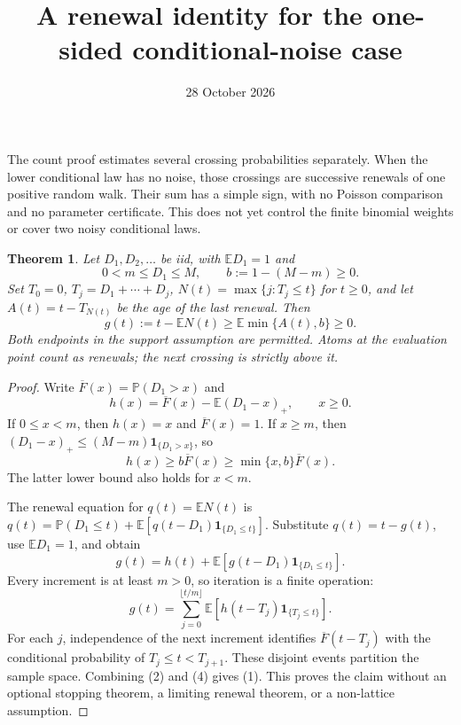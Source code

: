 \documentclass[11pt]{article}
\title{A renewal identity for the one-sided conditional-noise case}
\author{}\date{28 October 2026}
\newtheorem{theorem}{Theorem}\newtheorem{lemma}{Lemma}
\newcommand{\E}{\mathbb E}\newcommand{\Pp}{\mathbb P}
\begin{document}
\maketitle

The count proof estimates several crossing probabilities separately. When
the lower conditional law has no noise, those crossings are successive
renewals of one positive random walk. Their sum has a simple sign, with no
Poisson comparison and no parameter certificate. This does not yet control
the finite binomial weights or cover two noisy conditional laws.

\begin{theorem}\label{thm:renewal}
Let $D_1,D_2,\ldots$ be iid, with $\E D_1=1$ and
\[
       0<m\le D_1\le M,\qquad b:=1-(M-m)\ge0.
\]
Set $T_0=0$, $T_j=D_1+\cdots+D_j$,
$N(t)=\max\{j:T_j\le t\}$ for $t\ge0$, and let
$A(t)=t-T_{N(t)}$ be the age of the last renewal. Then
\[
 g(t):=t-\E N(t)\ge \E\min\{A(t),b\}\ge0.                 \tag{1}
\]
Both endpoints in the support assumption are permitted. Atoms at the
evaluation point count as renewals; the next crossing is strictly above it.
\end{theorem}
\begin{proof}
Write $\overline F(x)=\Pp(D_1>x)$ and
\[
 h(x)=\overline F(x)-\E(D_1-x)_+,\qquad x\ge0.
\]
If $0\le x<m$, then $h(x)=x$ and $\overline F(x)=1$.
If $x\ge m$, then
$(D_1-x)_+\le(M-m)\mathbf1_{\{D_1>x\}}$, so
\[
 h(x)\ge b\overline F(x)\ge\min\{x,b\}\overline F(x).
                                                               \tag{2}
\]
The latter lower bound also holds for $x<m$.

The renewal equation for $q(t)=\E N(t)$ is
$q(t)=\Pp(D_1\le t)+\E[q(t-D_1)\mathbf1_{\{D_1\le t\}}]$.
Substitute $q(t)=t-g(t)$, use $\E D_1=1$, and obtain
\[
 g(t)=h(t)+\E[g(t-D_1)\mathbf1_{\{D_1\le t\}}].             \tag{3}
\]
Every increment is at least $m>0$, so iteration is a finite operation:
\[
 g(t)=\sum_{j=0}^{\lfloor t/m\rfloor}
       \E[h(t-T_j)\mathbf1_{\{T_j\le t\}}].                 \tag{4}
\]
For each $j$, independence of the next increment identifies
$\overline F(t-T_j)$ with the conditional probability of
$T_j\le t<T_{j+1}$. These disjoint events partition the sample space.
Combining (2) and (4) gives (1). This proves the claim without an optional
stopping theorem, a limiting renewal theorem, or a non-lattice assumption.
\end{proof}
\end{document}
